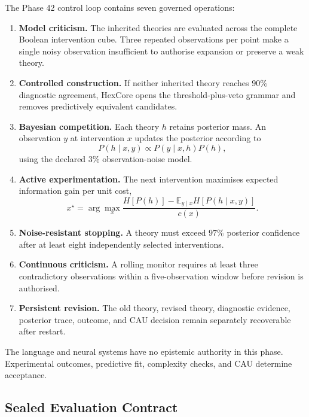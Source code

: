The Phase 42 control loop contains seven governed operations:
\begin{enumerate}
  \item \textbf{Model criticism.} The inherited theories are evaluated across
  the complete Boolean intervention cube. Three repeated observations per
  point make a single noisy observation insufficient to authorise expansion or
  preserve a weak theory.
  \item \textbf{Controlled construction.} If neither inherited theory reaches
  $90\%$ diagnostic agreement, HexCore opens the threshold-plus-veto grammar
  and removes predictively equivalent candidates.
  \item \textbf{Bayesian competition.} Each theory $h$ retains posterior mass.
  An observation $y$ at intervention $x$ updates the posterior according to
  \begin{equation}
    P(h\mid x,y)\propto P(y\mid x,h)P(h),
  \end{equation}
  using the declared $3\%$ observation-noise model.
  \item \textbf{Active experimentation.} The next intervention maximises
  expected information gain per unit cost,
  \begin{equation}
    x^\star=\arg\max_x
    \frac{
      H[P(h)]-\mathbb{E}_{y\mid x}H[P(h\mid x,y)]
    }{c(x)}.
  \end{equation}
  \item \textbf{Noise-resistant stopping.} A theory must exceed $97\%$
  posterior confidence after at least eight independently selected
  interventions.
  \item \textbf{Continuous criticism.} A rolling monitor requires at least
  three contradictory observations within a five-observation window before
  revision is authorised.
  \item \textbf{Persistent revision.} The old theory, revised theory,
  diagnostic evidence, posterior trace, outcome, and CAU decision remain
  separately recoverable after restart.
\end{enumerate}

The language and neural systems have no epistemic authority in this phase.
Experimental outcomes, predictive fit, complexity checks, and CAU determine
acceptance.

\subsection{Sealed Evaluation Contract}


